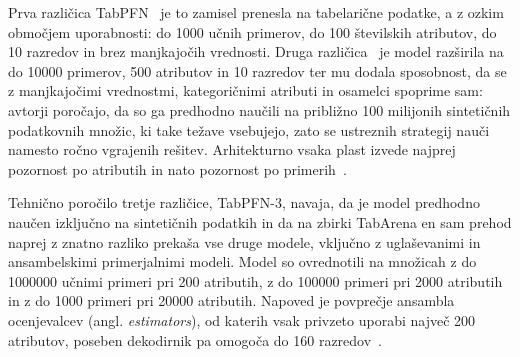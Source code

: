 \documentclass[a4paper,12pt,openright]{book}
\begin{document}
Prva različica TabPFN~\cite{hollmann2023tabpfn} je to zamisel prenesla na
tabelarične podatke, a z ozkim območjem uporabnosti: do 1000 učnih primerov, do
100 številskih atributov, do 10 razredov in brez manjkajočih vrednosti. Druga
različica~\cite{hollmann2025tabpfn} je model razširila na do \num{10000}
primerov, 500 atributov in 10 razredov ter mu dodala sposobnost, da se z
manjkajočimi vrednostmi, kategoričnimi atributi in osamelci spoprime sam:
avtorji poročajo, da so ga predhodno naučili na približno 100 milijonih
sintetičnih podatkovnih množic, ki take težave vsebujejo, zato se ustreznih
strategij nauči namesto ročno vgrajenih rešitev. Arhitekturno vsaka plast
izvede najprej pozornost po atributih in nato pozornost po
primerih~\cite{hollmann2025tabpfn}.

Tehnično poročilo tretje različice, TabPFN-3, navaja, da je model predhodno
naučen izključno na sintetičnih podatkih in da na zbirki TabArena en sam
prehod naprej z znatno razliko prekaša vse druge modele, vključno z
uglaševanimi in ansambelskimi primerjalnimi modeli. Model so ovrednotili na
množicah z do \num{1000000} učnimi primeri pri 200 atributih, z do
\num{100000} primeri pri 2000 atributih in z do 1000 primeri pri \num{20000}
atributih. Napoved je povprečje ansambla ocenjevalcev (angl.
\emph{estimators}), od katerih vsak privzeto uporabi največ 200 atributov,
poseben dekodirnik pa omogoča do 160 razredov~\cite{grinsztajn2026tabpfn3}.
\end{document}
